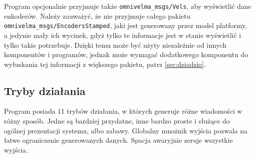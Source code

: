 		Program opcjonalnie przyjmuje także \texttt{omnivelma\_msgs/Vels}, aby wyświetlić dane enkoderów.
		Należy zauważyć, że nie przyjmuje całego pakietu \texttt{omnivelma\_msgs/EncodersStamped}, jaki jest generowany przez model platformy,
		a jedynie mały ich wycinek, gdyż tylko te informacje jest w stanie wyświetlić i tylko takie potrzebuje.
		Dzięki temu może być użyty niezależnie od innych komponentów i programów, jednak może wymagać dodatkowego komponentu do wyłuskania tej informacji z większego pakietu,
		patrz \ref{sec:dziadzio}.
		
	\subsection{Tryby działania}
		Program posiada 11 trybów działania, w których generuje różne wiadomości w różny sposób.
		Jedne są bardziej przydatne, inne bardzo proste i służące do ogólnej prezentacji systemu, albo zabawy.
		Globalny mnożnik wyjścia pozwala na łatwe ograniczenie generowanych danych. Spacja awaryjnie zeruje wszystkie wyjścia.
